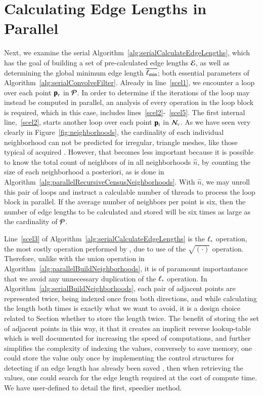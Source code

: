 \section{Calculating Edge Lengths in Parallel}
\label{ch6sCEL}
Next, we examine the serial Algorithm~\ref{alg:serialCalculateEdgeLengths}, which has the goal of building a set of pre-calculated edge lengths $\mathcal{E}$, as well as determining the global minimum edge length $\overline{\ell_\text{min}}$; both essential parameters of  Algorithm~\ref{alg:serialConvolveFilter}. Already in line~\ref{scel1}, we encounter a loop over each point $\mathbf{p}_v$ in $\mathcal{P}$. In order to determine if the iterations of the loop may instead be computed in parallel, an analysis of every operation in the loop block is required, which in this case, includes lines~\ref{scel2}-~\ref{scel5}. The first internal line,~\ref{scel2}, starts another loop over each point $\mathbf{p}_i$ in $\mathcal{N}_v$.  As we have seen very clearly in Figure~\ref{fig:neighborhoods}, the cardinality of each individual neighborhood can not be predicted for irregular, triangle meshes, like those typical of acquired \tdd{}. However, that becomes less important because it is possible to know the total count of neighbors of in all neighborhoods $\hat{n}$, by counting the size of each neighborhood a posteriori, as is done in Algorithm~\ref{alg:parallelRecursiveCensusNeighborhoods}. With $\hat{n}$, we may unroll this pair of loops and instruct a calculable number of threads to process the loop block in parallel. If the average number of neighbors per point is six, then the number of edge lengths to be calculated and stored will be six times as large as the cardinality of $\mathcal{P}$.

Line~\ref{scel3} of Algorithm~\ref{alg:serialCalculateEdgeLengths} is the $\ell_\ast$ operation, the most costly operation performed by , due to use of the $\sqrt{(\cdot)}$ operation. Therefore, unlike with the union operation in Algorithm~\ref{alg:parallelBuildNeighborhoods}, it is of paramount importantance that we avoid any unnecessary duplication of the $\ell_\ast$ operation. In Algorithm~\ref{alg:serialBuildNeighborhoods}, each pair of adjacent points are represented twice, being indexed once from both directions, and while calculating the length both times is exactly what we want to avoid, it is a design choice related to Section whether to store the length twice. The benefit of storing the set of adjacent points in this way, it that it creates an implicit reverse lookup-table which is well documented for increasing the speed of computations, and further simplifies the complexity of indexing the values, conversely to save memory, one could store the value only once by implementing the control structures for detecting if an edge length has already been saved , then when retrieving the values, one could search for the edge length required at the cost of compute time. We have user-defined to detail the first, speedier method.


